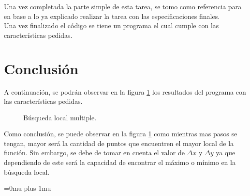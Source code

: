 \documentclass{article}
\begin{document}
Una vez completada la parte simple de esta tarea, se tomo como referencia \citep{DRA.Code} para en base a lo ya explicado realizar la tarea con las especificaciones finales.\\ 

Una vez finalizado el código se tiene un programa el cual cumple con las características pedidas.\\



\section{Conclusión}

A continuación, se podrán observar en la figura \ref{f2} los resultados del programa con las características pedidas.

\begin{figure}[H]
\centering
{}
\caption{B\'usqueda local multiple.} 
\label{f2}
\end{figure}


Como conclusión, se puede observar en la  figura \ref{f2} como mientras mas pasos se tengan, mayor será la cantidad de puntos que encuentren el mayor local de la función. Sin embargo, se debe de tomar en cuenta el valor de $\Delta x$ y $\Delta y$ ya que dependiendo de este será la capacidad de encontrar el máximo o mínimo en la búsqueda local.

\Urlmuskip=0mu plus 1mu\relax


\end{document}
